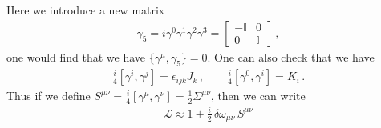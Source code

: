 \documentclass[11pt, onesided]{book}
\theoremstyle{break}
\theoremstyle{break}
\newcommand{\bmat}[1]{\begin{bmatrix} #1 \end{bmatrix}}
\begin{document}
Here we introduce a new matrix
\begin{align*}
\gamma_5 = i\gamma^0 \gamma^1 \gamma^2 \gamma^3 = \bmat{-\mathbb{I} & 0 \\ 0 &\mathbb{I}}\,,
\end{align*}
one would find that we have $\{\gamma^\mu, \gamma_5\} = 0$. One can also check that we have
\begin{align*}
\frac{i}{4}[\gamma^i, \gamma^j] = \epsilon_{ijk}J_k\,,\qquad
\frac{i}{4}[\gamma^0, \gamma^i] = K_i\,.
\end{align*}
Thus if we define $S^{\mu\nu} = \frac{i}{4}[\gamma^\mu, \gamma^\nu] = \frac{1}{2}\Sigma^{\mu\nu}$, then we can write
\begin{align*}
\mathcal{L} \approx 1 + \frac{i}{2}\, \delta\omega_{\mu\nu}\, S^{\mu\nu}
\end{align*}
\end{document}
